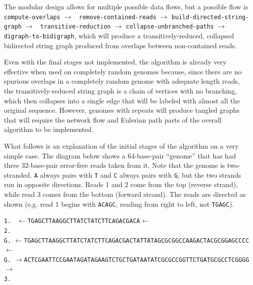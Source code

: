 \documentclass[letterpaper,12pt]{article}
\begin{document}
The modular design allows for multiple possible data flows, but a possible flow
is
{\tt compute-overlaps} $\to$ {\tt
remove-contained-reads} $\to$ {\tt build-directed-string-graph} $\to$ {\tt
transitive-reduction} $\to$ {\tt collapse-unbranched-paths} $\to$ {\tt digraph-to-bidigraph}, which will produce a
transitively-reduced, collapsed bidirected string graph produced from overlaps
between non-contained reads.

Even with the final stages not implemented, the algorithm is already very
effective when used on completely random genomes because, since there are no
spurious overlaps in a completely random genome with adequate length reads, the
transitively-reduced string graph is a chain of vertices with no branching,
which then collapses into a single edge that will be labeled with almost all the
original sequence.
However, genomes with repeats will produce tangled graphs that will require the
network flow and Eulerian path parts of the overall algorithm to be implemented.

What follows is an explanation of the initial stages of the algorithm on a very
simple case.  The diagram below shows a 64-base-pair ``genome'' that has had
three 32-base-pair error-free reads taken from it.  Note that the genome is
two-stranded.  {\tt A} always pairs with {\tt T} and {\tt C} always pairs with
{\tt G}, but the two strands run in opposite directions.  Reads 1 and 2 come
from the top (reverse strand), while read 3 comes from the bottom (forward
strand).  The reads are directed as shown (e.g.  read 1 begins with {\tt ACAGC},
reading from right to left, not {\tt TGAGC}).

\vspace{0.5cm}
\nopagebreak

\noindent
{\tt 1.}
{\tt \color{red} $\leftarrow$TGAGCTTAAGGCTTATCTATCTTCAGACGACA$\leftarrow$ }\\
{\tt 2.}
\\
{\tt G.}
{\tt $\leftarrow$TGAGCTTAAGGCTTATCTATCTTCAGACGACTATTATAGCGCGGCCAAGACTACGCGGAGCCCC$\leftarrow$} \\
{\tt G.}
{\tt $\rightarrow$ACTCGAATTCCGAATAGATAGAAGTCTGCTGATAATATCGCGCCGGTTCTGATGCGCCTCGGGG$\rightarrow$} \\
{\tt 3.}
\vspace{0.5cm}
\end{document}
